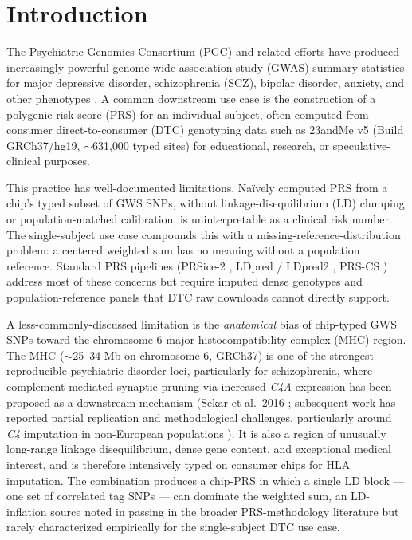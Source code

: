 \documentclass[11pt,a4paper]{article}
\begin{document}
\section{Introduction}

The Psychiatric Genomics Consortium (PGC) and related efforts have produced increasingly powerful genome-wide association study (GWAS) summary statistics for major depressive disorder, schizophrenia (SCZ), bipolar disorder, anxiety, and other phenotypes \cite{trubetskoy2022,lam2019,bip2024,mdd2025}. A common downstream use case is the construction of a polygenic risk score (PRS) for an individual subject, often computed from consumer direct-to-consumer (DTC) genotyping data such as 23andMe v5 (Build GRCh37/hg19, $\sim$631{,}000 typed sites) for educational, research, or speculative-clinical purposes.

This practice has well-documented limitations. Naïvely computed PRS from a chip's typed subset of GWS SNPs, without linkage-disequilibrium (LD) clumping or population-matched calibration, is uninterpretable as a clinical risk number. The single-subject use case compounds this with a missing-reference-distribution problem: a centered weighted sum has no meaning without a population reference. Standard PRS pipelines (PRSice-2 \cite{choi2020}, LDpred / LDpred2 \cite{vilhjalmsson2015,prive2020}, PRS-CS \cite{ge2019}) address most of these concerns but require imputed dense genotypes and population-reference panels that DTC raw downloads cannot directly support.

A less-commonly-discussed limitation is the \emph{anatomical} bias of chip-typed GWS SNPs toward the chromosome 6 major histocompatibility complex (MHC) region. The MHC ($\sim$25--34 Mb on chromosome 6, GRCh37) is one of the strongest reproducible psychiatric-disorder loci, particularly for schizophrenia, where complement-mediated synaptic pruning via increased \emph{C4A} expression has been proposed as a downstream mechanism (Sekar et al.~2016 \cite{sekar2016}; subsequent work has reported partial replication and methodological challenges, particularly around \emph{C4} imputation in non-European populations \cite{kim2021}). It is also a region of unusually long-range linkage disequilibrium, dense gene content, and exceptional medical interest, and is therefore intensively typed on consumer chips for HLA imputation. The combination produces a chip-PRS in which a single LD block --- one set of correlated tag SNPs --- can dominate the weighted sum, an LD-inflation source noted in passing in the broader PRS-methodology literature \cite{wray2014} but rarely characterized empirically for the single-subject DTC use case.
\end{document}
